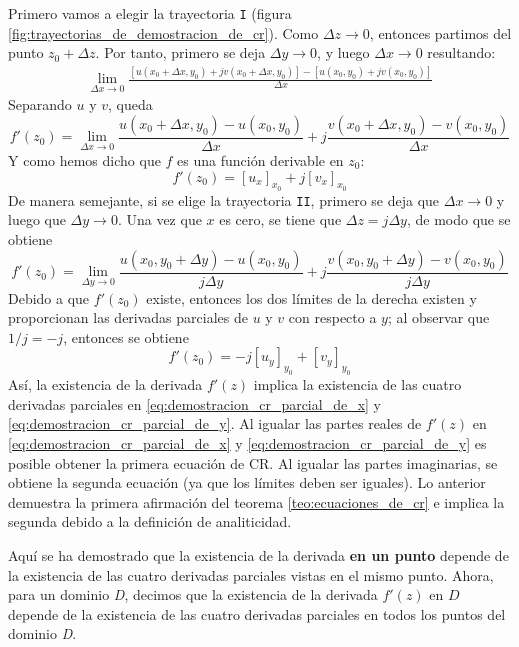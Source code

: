 Primero vamos a elegir la trayectoria \texttt{I} (figura \ref{fig:trayectorias_de_demostracion_de_cr}). Como $\Delta z \to 0$, entonces partimos del punto $z_0+\Delta z$. Por tanto, primero se deja $\Delta y \to 0$, y luego $\Delta x \to 0$ resultando:
\begin{align*}
  \lim_{\Delta x \to 0}\frac{[u(x_0+\Delta x,y_0)+jv(x_0+\Delta x, y_0)]-[u(x_0,y_0)+jv(x_0,y_0)]}{\Delta x}
\end{align*}
Separando $u$ y $v$, queda
\begin{equation*}
  f'(z_0)=\lim_{\Delta x \to 0} \frac{u(x_0+\Delta x,y_0)-u(x_0,y_0)}{\Delta x} + j\frac{v(x_0+\Delta x,y_0)-v(x_0,y_0)}{\Delta x}
\end{equation*}
Y como hemos dicho que $f$ es una función derivable en $z_0$:
\begin{equation}\label{eq:demostracion_cr_parcial_de_x}
  \boxed{f'(z_0)=[u_x]_{x_0} + j[v_x]_{x_0}}
\end{equation}
De manera semejante, si se elige la trayectoria \texttt{II}, primero se deja que $\Delta x \to 0$ y luego que $\Delta y \to 0$. Una vez que $x$ es cero, se tiene que $\Delta z = j\Delta y$, de modo que se obtiene
\begin{equation*}
  f'(z_0) = \lim_{\Delta y \to 0}\frac{u(x_0,y_0+\Delta y)-u(x_0,y_0)}{j\Delta y} + j\frac{v(x_0,y_0+\Delta y)-v(x_0,y_0)}{j\Delta y}
\end{equation*}
Debido a que $f'(z_0)$ existe, entonces los dos límites de la derecha existen y proporcionan las derivadas parciales de $u$ y $v$ con respecto a $y$; al observar que $1/j=-j$, entonces se obtiene
\begin{equation}\label{eq:demostracion_cr_parcial_de_y}
  \boxed{f'(z_0) = -j[u_y]_{y_0} + [v_y]_{y_0}}
\end{equation}
Así, la existencia de la derivada $f'(z)$ implica la existencia de las cuatro derivadas parciales en \ref{eq:demostracion_cr_parcial_de_x} y \ref{eq:demostracion_cr_parcial_de_y}. Al igualar las partes reales de $f'(z)$ en \ref{eq:demostracion_cr_parcial_de_x} y \ref{eq:demostracion_cr_parcial_de_y} es posible obtener la primera ecuación de CR. Al igualar las partes imaginarias, se obtiene la segunda ecuación (ya que los límites deben ser iguales). Lo anterior demuestra la primera afirmación del teorema \ref{teo:ecuaciones_de_cr} e implica la segunda debido a la definición de analiticidad.

Aquí se ha demostrado que la existencia de la derivada \textbf{en un punto} depende de la existencia de las cuatro derivadas parciales vistas en el mismo punto. Ahora, para un dominio \textit{D}, decimos que la existencia de la derivada $f'(z)$ en $D$ depende de la existencia de las cuatro derivadas parciales en todos los puntos del dominio \textit{D}.

